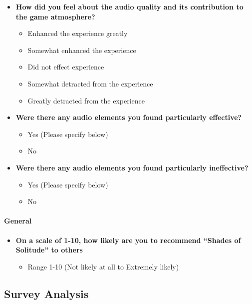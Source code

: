 \documentclass[
  letterpaper,
  DIV=11,
  numbers=noendperiod]{scrartcl}
\let\oldparagraph\paragraph
\renewcommand{\paragraph}[1]{\oldparagraph{#1}\mbox{}}
\providecommand{\tightlist}{%
  \setlength{\itemsep}{0pt}\setlength{\parskip}{0pt}}\usepackage{longtable,booktabs,array}
\begin{document}
\begin{itemize}
\item
  \textbf{How did you feel about the audio quality and its contribution
  to the game atmosphere?}

  \begin{itemize}
  \tightlist
  \item
    Enhanced the experience greatly
  \item
    Somewhat enhanced the experience
  \item
    Did not effect experience
  \item
    Somewhat detracted from the experience
  \item
    Greatly detracted from the experience
  \end{itemize}
\item
  \textbf{Were there any audio elements you found particularly
  effective?}

  \begin{itemize}
  \tightlist
  \item
    Yes (Please specify below)
  \item
    No
  \end{itemize}
\item
  \textbf{Were there any audio elements you found particularly
  ineffective?}

  \begin{itemize}
  \tightlist
  \item
    Yes (Please specify below)
  \item
    No
  \end{itemize}
\end{itemize}

\paragraph{General}\label{general}

\begin{itemize}
\item
  \textbf{On a scale of 1-10, how likely are you to recommend ``Shades
  of Solitude'' to others}

  \begin{itemize}
  \tightlist
  \item
    Range 1-10 (Not likely at all to Extremely likely)
  \end{itemize}
\end{itemize}

\subsection{Survey Analysis}\label{survey-analysis}
\end{document}
